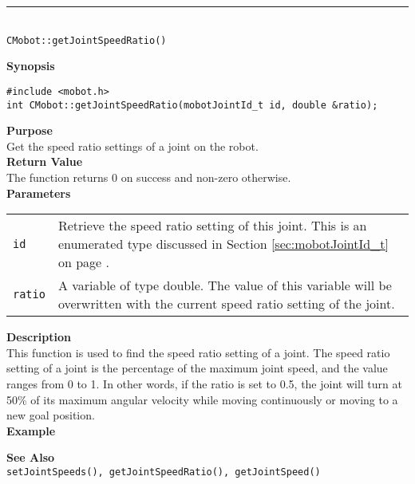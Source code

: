 \noindent
\vspace{5pt}
\rule{4.5in}{0.015in}\\
\noindent
{\LARGE \texttt{CMobot::getJointSpeedRatio()}}\\
{}

\noindent
{\bf Synopsis}
\vspace{-8pt}
\begin{verbatim}
#include <mobot.h>
int CMobot::getJointSpeedRatio(mobotJointId_t id, double &ratio);
\end{verbatim}

\noindent
{\bf Purpose}\\
Get the speed ratio settings of a joint on the robot.\\

\noindent
{\bf Return Value}\\
The function returns 0 on success and non-zero otherwise.\\

\noindent
{\bf Parameters}
\vspace{-0.1in}
\begin{description}
\item               
\begin{tabular}{p{10 mm}p{145 mm}}
\texttt{id} & Retrieve the speed ratio setting of this joint. This is an 
enumerated type discussed in Section \ref{sec:mobotJointId_t} on page
\pageref{sec:mobotJointId_t}.\\
\texttt{ratio} & A variable of type double. The value of this variable will
be overwritten with the current speed ratio setting of the joint.
\end{tabular}
\end{description}

\noindent
{\bf Description}\\
This function is used to find the speed ratio setting of a joint. The speed
ratio setting of a joint is the percentage of the maximum joint speed, and the
value ranges from 0 to 1. In other words, if the ratio is set to 0.5, the joint 
will turn at 50\% of its maximum angular velocity while moving continuously
or moving to a new goal position.\\

\noindent
{\bf Example}\\
\noindent

\noindent
{\bf See Also}\\
\texttt{setJointSpeeds(), getJointSpeedRatio(), getJointSpeed()}

